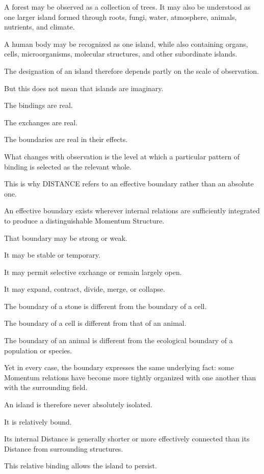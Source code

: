 A forest may be observed as a collection of trees. It may also be understood as one larger island formed through roots, fungi, water, atmosphere, animals, nutrients, and climate.

A human body may be recognized as one island, while also containing organs, cells, microorganisms, molecular structures, and other subordinate islands.

The designation of an island therefore depends partly on the scale of observation.

But this does not mean that islands are imaginary.

The bindings are real.

The exchanges are real.

The boundaries are real in their effects.

What changes with observation is the level at which a particular pattern of binding is selected as the relevant whole.

This is why DISTANCE refers to an effective boundary rather than an absolute one.

An effective boundary exists wherever internal relations are sufficiently integrated to produce a distinguishable Momentum Structure.

That boundary may be strong or weak.

It may be stable or temporary.

It may permit selective exchange or remain largely open.

It may expand, contract, divide, merge, or collapse.

The boundary of a stone is different from the boundary of a cell.

The boundary of a cell is different from that of an animal.

The boundary of an animal is different from the ecological boundary of a population or species.

Yet in every case, the boundary expresses the same underlying fact: some Momentum relations have become more tightly organized with one another than with the surrounding field.

An island is therefore never absolutely isolated.

It is relatively bound.

Its internal Distance is generally shorter or more effectively connected than its Distance from surrounding structures.

This relative binding allows the island to persist.

